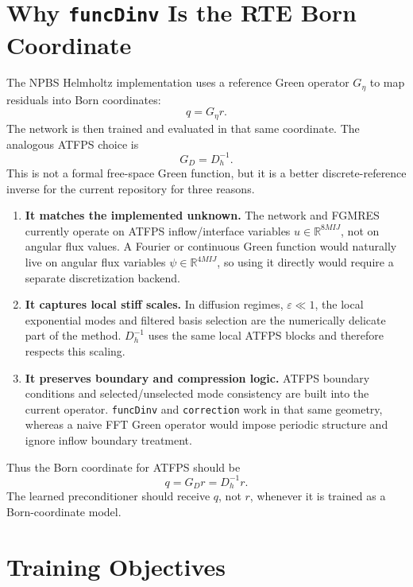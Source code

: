 \documentclass[11pt]{article}
\newcommand{\R}{\mathbb{R}}
\begin{document}
\section{Why \texttt{funcDinv} Is the RTE Born Coordinate}

The NPBS Helmholtz implementation uses a reference Green operator \(G_\eta\) to
map residuals into Born coordinates:
\[
  q = G_\eta r.
\]
The network is then trained and evaluated in that same coordinate.  The
analogous ATFPS choice is
\[
  G_D = D_h^{-1}.
\]
This is not a formal free-space Green function, but it is a better
discrete-reference inverse for the current repository for three reasons.

\begin{enumerate}[leftmargin=2em]
  \item \textbf{It matches the implemented unknown.}
  The network and FGMRES currently operate on ATFPS inflow/interface variables
  \(u\in\R^{8M I J}\), not on angular flux values.  A Fourier or continuous
  Green function would naturally live on angular flux variables
  \(\psi\in\R^{4M I J}\), so using it directly would require a separate
  discretization backend.

  \item \textbf{It captures local stiff scales.}
  In diffusion regimes, \(\varepsilon\ll 1\), the local exponential modes and
  filtered basis selection are the numerically delicate part of the method.
  \(D_h^{-1}\) uses the same local ATFPS blocks and therefore respects this
  scaling.

  \item \textbf{It preserves boundary and compression logic.}
  ATFPS boundary conditions and selected/unselected mode consistency are built
  into the current operator.  \texttt{funcDinv} and \texttt{correction} work in
  that same geometry, whereas a naive FFT Green operator would impose periodic
  structure and ignore inflow boundary treatment.
\end{enumerate}

Thus the Born coordinate for ATFPS should be
\begin{equation}
  q = G_D r = D_h^{-1} r.
  \label{eq:born-coordinate}
\end{equation}
The learned preconditioner should receive \(q\), not \(r\), whenever it is
trained as a Born-coordinate model.

\section{Training Objectives}
\end{document}
